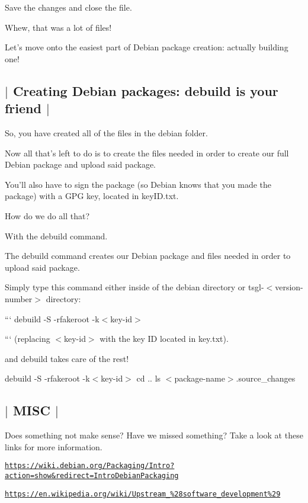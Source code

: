 Save the changes and close the file.

Whew, that was a lot of files!

Let's move onto the easiest part of Debian package creation\-: actually building one! 

 \subsection*{$\vert$ Creating Debian packages\-: {\ttfamily debuild} is your friend $\vert$ }

So, you have created all of the files in the debian folder.

Now all that's left to do is to create the files needed in order to create our full Debian package and upload said package.

You'll also have to sign the package (so Debian knows that you made the package) with a G\-P\-G key, located in key\-I\-D.\-txt.

How do we do all that?

With the {\ttfamily debuild} command.

The {\ttfamily debuild} command creates our Debian package and files needed in order to upload said package.

Simply type this command either inside of the {\ttfamily debian} directory or {\ttfamily tsgl-\/$<$version-\/number$>$} directory\-:

``` debuild -\/\-S -\/rfakeroot -\/k$<$key-\/id$>$

``` (replacing $<$key-\/id$>$ with the key I\-D located in key.\-txt).

and debuild takes care of the rest!

debuild -\/\-S -\/rfakeroot -\/k$<$key-\/id$>$ cd .. ls $<$package-\/name$>$.source\-\_\-changes 

 \subsection*{$\vert$ M\-I\-S\-C $\vert$ }

Does something not make sense? Have we missed something? Take a look at these links for more information.

\href{https://wiki.debian.org/Packaging/Intro?action=show&redirect=IntroDebianPackaging}{\tt https\-://wiki.\-debian.\-org/\-Packaging/\-Intro?action=show\&redirect=\-Intro\-Debian\-Packaging}

\href{https://en.wikipedia.org/wiki/Upstream_%28software_development%29}{\tt https\-://en.\-wikipedia.\-org/wiki/\-Upstream\-\_\-\%28software\-\_\-development\%29}

